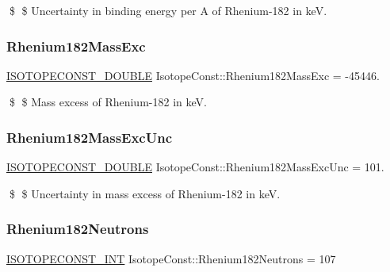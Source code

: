 \$ \$ Uncertainty in binding energy per A of Rhenium-\/182 in keV. \mbox{\label{group___isotope_const-_rhenium-_re182_ga97f74113fb79c964ae54ea629b6c5572}} 
\subsubsection{\texorpdfstring{Rhenium182\+Mass\+Exc}{Rhenium182MassExc}}
{\footnotesize\ttfamily \mbox{\hyperlink{group___isotope_const-_macros_ga8f45a7272ce02c0b4c65c44636ed719a}{I\+S\+O\+T\+O\+P\+E\+C\+O\+N\+S\+T\+\_\+\+D\+O\+U\+B\+LE}} Isotope\+Const\+::\+Rhenium182\+Mass\+Exc = -\/45446.}

\$ \$ Mass excess of Rhenium-\/182 in keV. \mbox{\label{group___isotope_const-_rhenium-_re182_ga82f3e60f177dd91aafef65ae5ecc9533}} 
\subsubsection{\texorpdfstring{Rhenium182\+Mass\+Exc\+Unc}{Rhenium182MassExcUnc}}
{\footnotesize\ttfamily \mbox{\hyperlink{group___isotope_const-_macros_ga8f45a7272ce02c0b4c65c44636ed719a}{I\+S\+O\+T\+O\+P\+E\+C\+O\+N\+S\+T\+\_\+\+D\+O\+U\+B\+LE}} Isotope\+Const\+::\+Rhenium182\+Mass\+Exc\+Unc = 101.}

\$ \$ Uncertainty in mass excess of Rhenium-\/182 in keV. \mbox{\label{group___isotope_const-_rhenium-_re182_gac74dc2b29b613ad2dc9c9f73979bc3cd}} 
\subsubsection{\texorpdfstring{Rhenium182\+Neutrons}{Rhenium182Neutrons}}
{\footnotesize\ttfamily \mbox{\hyperlink{group___isotope_const-_macros_ga5f18360b3e99483a35c32d789e62621c}{I\+S\+O\+T\+O\+P\+E\+C\+O\+N\+S\+T\+\_\+\+I\+NT}} Isotope\+Const\+::\+Rhenium182\+Neutrons = 107}

